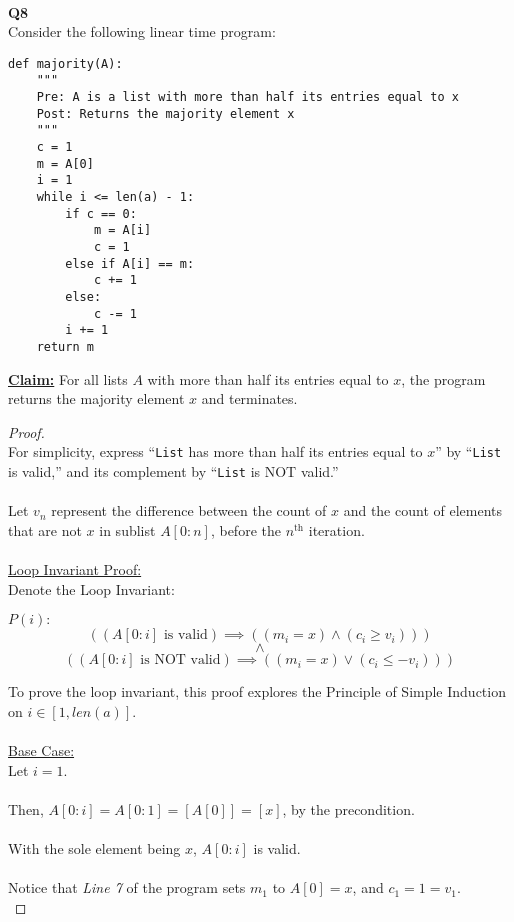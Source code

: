 \documentclass[12pt]{article}
\begin{document}
\leavevmode\\
\textbf{Q8} \\
Consider the following linear time program:
\begin{lstlisting}
def majority(A):
    """
    Pre: A is a list with more than half its entries equal to x
    Post: Returns the majority element x
    """
    c = 1
    m = A[0]
    i = 1
    while i <= len(a) - 1:
        if c == 0:
            m = A[i]
            c = 1
        else if A[i] == m:
            c += 1
        else:
            c -= 1
        i += 1
    return m
\end{lstlisting}
\textbf{\underline{Claim:}} For all lists $A$ with more than half its entries equal to $x$, the program returns the majority element $x$ and terminates. \\
\begin{proof}
\leavevmode\\
    For simplicity, express ``\texttt{List} has more than half its entries equal to $x$'' by ``\texttt{List} is valid,'' and its complement by ``\texttt{List} is NOT valid.''\\
    \\
    Let $v_n$ represent the difference between the count of $x$ and the count of elements that are not $x$ in sublist $A[0:n]$, before the $n^{\text{th}}$ iteration. \\
    \\
    \underline{Loop Invariant Proof:} \\
    Denote the Loop Invariant:
    \begin{center}
        \(P(i):\)
        \[((A[0:i] \text{ is valid}) \implies ((m_i = x) \land (c_i \geq v_i)))\]
        \[\land\]
        \[((A[0:i] \text{ is NOT valid}) \implies ((m_i = x) \lor (c_i \leq -v_i)))\]
    \end{center}
    To prove the loop invariant, this proof explores the Principle of Simple Induction on $i \in [1, len(a)]$. \\
    \\    
    \underline{Base Case:} \\
    Let $i = 1$. \\
    \\
    Then, $A[0:i] = A[0:1] = [A[0]] = [x]$, by the precondition. \\
    \\
    With the sole element being $x$, $A[0:i]$ is valid. \\
    \\
    Notice that \textit{Line 7} of the program sets $m_1$ to $A[0] = x$, and $c_1 = 1 = v_1$. \\

\end{proof}
\end{document}

